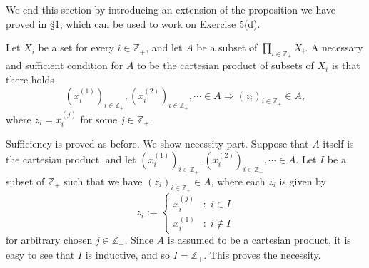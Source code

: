 \documentclass[a4paper,12pt]{article}
\begin{document}
We end this section by introducing an extension of the proposition we have proved in \S1, which can be used to work on Exercise 5(d).
\begin{prp}
	Let
	\( X_i \)
	be a set for every
	\( i \in \mathbb{Z}_{+} \),
	and let
	\( A \)
	be a subset of
	\( \prod_{i \in \mathbb{Z}_{+}} X_i \).
	A necessary and sufficient condition for \( A \) to be the cartesian product of subsets of \( X_i \) is that there holds
	\begin{equation*}
		\left( x_i^{(1)} \right)_{i \in \mathbb{Z}_{+}},
		\left( x_i^{(2)} \right)_{i \in \mathbb{Z}_{+}},\cdots \in A 
		\Rightarrow
		(z_i)_{i \in \mathbb{Z}_{+}} \in A,
	\end{equation*}
	where \( z_i=x_i^{(j)} \)
	for some
	\( j \in \mathbb{Z}_{+}\).
\end{prp}
\begin{prf}
	Sufficiency is proved as before.
	We show necessity part.
	Suppose that \( A \) itself is the cartesian product,
	and let
	\( \left( x_i^{(1)} \right)_{i \in \mathbb{Z}_{+}}
	,\left( x_i^{(2)} \right)_{i \in \mathbb{Z}_{+}},\cdots \in A \).
	Let \( I \) be a subset of \( \mathbb{Z}_{+} \) such that we have
	\( (z_i)_{i \in \mathbb{Z}_{+}} \in A \),
	where each \( z_i \) is given by
	\begin{equation*}
		z_i:=\begin{cases}
			x_i^{(j)} & \mathrm{:}\;i \in I    \\
			x_i^{(1)} & \mathrm{:}\;i \notin I
		\end{cases}
	\end{equation*}
	for arbitrary chosen
	\( j \in \mathbb{Z}_{+}\).
	Since \( A \) is assumed to be a cartesian product,
	it is easy to see that \( I \) is inductive, and so \( I=\mathbb{Z}_{+} \).
	This proves the necessity.
\end{prf}
\end{document}
